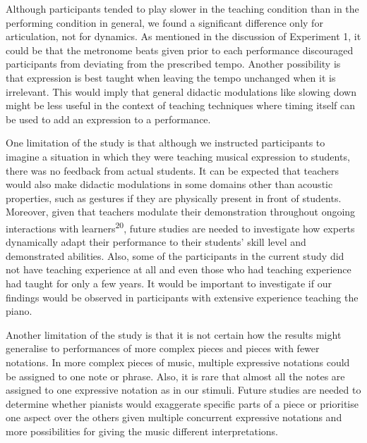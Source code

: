 \documentclass[
  man,floatsintext]{apa6}
\begin{document}
Although participants tended to play slower in the teaching condition than in the performing condition in general, we found a significant difference only for articulation, not for dynamics. As mentioned in the discussion of Experiment 1, it could be that the metronome beats given prior to each performance discouraged participants from deviating from the prescribed tempo. Another possibility is that expression is best taught when leaving the tempo unchanged when it is irrelevant. This would imply that general didactic modulations like slowing down might be less useful in the context of teaching techniques where timing itself can be used to add an expression to a performance.

One limitation of the study is that although we instructed participants to imagine a situation in which they were teaching musical expression to students, there was no feedback from actual students. It can be expected that teachers would also make didactic modulations in some domains other than acoustic properties, such as gestures if they are physically present in front of students. Moreover, given that teachers modulate their demonstration throughout ongoing interactions with learners\textsuperscript{20}, future studies are needed to investigate how experts dynamically adapt their performance to their students' skill level and demonstrated abilities. Also, some of the participants in the current study did not have teaching experience at all and even those who had teaching experience had taught for only a few years. It would be important to investigate if our findings would be observed in participants with extensive experience teaching the piano.

Another limitation of the study is that it is not certain how the results might generalise to performances of more complex pieces and pieces with fewer notations. In more complex pieces of music, multiple expressive notations could be assigned to one note or phrase. Also, it is rare that almost all the notes are assigned to one expressive notation as in our stimuli. Future studies are needed to determine whether pianists would exaggerate specific parts of a piece or prioritise one aspect over the others given multiple concurrent expressive notations and more possibilities for giving the music different interpretations.
\end{document}
